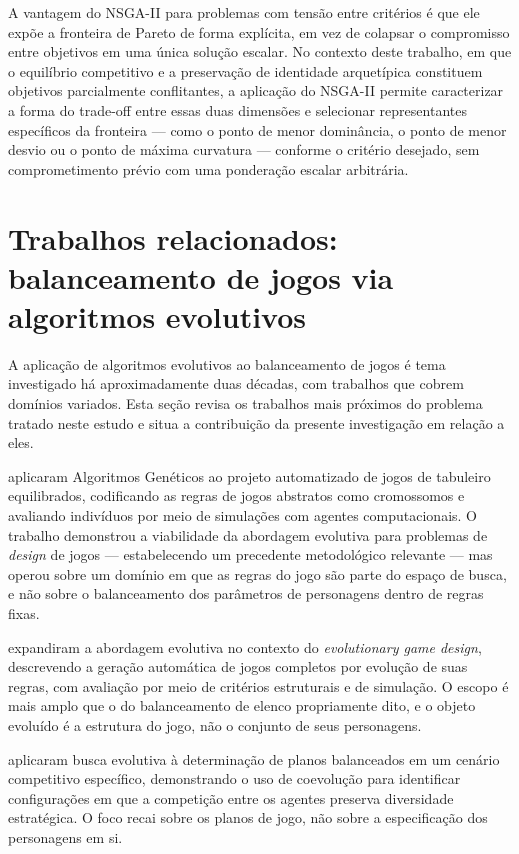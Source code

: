 A vantagem do NSGA-II para problemas com tensão entre critérios é que ele expõe a fronteira de Pareto de forma explícita, em vez de colapsar o compromisso entre objetivos em uma única solução escalar. No contexto deste trabalho, em que o equilíbrio competitivo e a preservação de identidade arquetípica constituem objetivos parcialmente conflitantes, a aplicação do NSGA-II permite caracterizar a forma do trade-off entre essas duas dimensões e selecionar representantes específicos da fronteira --- como o ponto de menor dominância, o ponto de menor desvio ou o ponto de máxima curvatura --- conforme o critério desejado, sem comprometimento prévio com uma ponderação escalar arbitrária.

\section{Trabalhos relacionados: balanceamento de jogos via algoritmos evolutivos}
\label{sec: trabalhos_relacionados}

A aplicação de algoritmos evolutivos ao balanceamento de jogos é tema investigado há aproximadamente duas décadas, com trabalhos que cobrem domínios variados. Esta seção revisa os trabalhos mais próximos do problema tratado neste estudo e situa a contribuição da presente investigação em relação a eles.

 aplicaram Algoritmos Genéticos ao projeto automatizado de jogos de tabuleiro equilibrados, codificando as regras de jogos abstratos como cromossomos e avaliando indivíduos por meio de simulações com agentes computacionais. O trabalho demonstrou a viabilidade da abordagem evolutiva para problemas de \textit{design} de jogos --- estabelecendo um precedente metodológico relevante --- mas operou sobre um domínio em que as regras do jogo são parte do espaço de busca, e não sobre o balanceamento dos parâmetros de personagens dentro de regras fixas.

 expandiram a abordagem evolutiva no contexto do \textit{evolutionary game design}, descrevendo a geração automática de jogos completos por evolução de suas regras, com avaliação por meio de critérios estruturais e de simulação. O escopo é mais amplo que o do balanceamento de elenco propriamente dito, e o objeto evoluído é a estrutura do jogo, não o conjunto de seus personagens.

 aplicaram busca evolutiva à determinação de planos balanceados em um cenário competitivo específico, demonstrando o uso de coevolução para identificar configurações em que a competição entre os agentes preserva diversidade estratégica. O foco recai sobre os planos de jogo, não sobre a especificação dos personagens em si.


